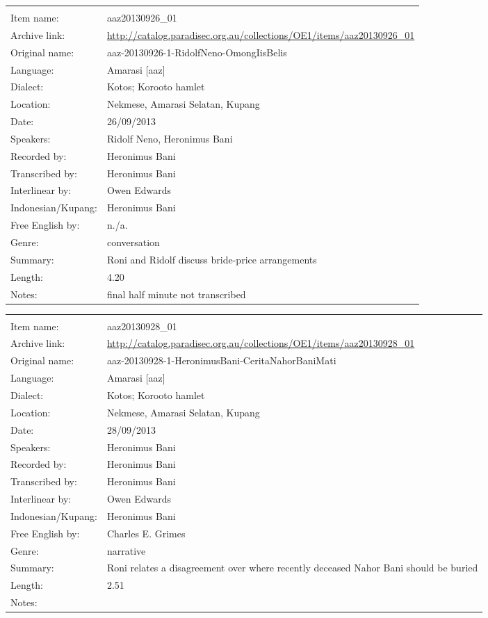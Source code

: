 \newpage
\noindent
\wg\begin{tabular}{lL{.67\textwidth}}
			& \\
Item name:			& aaz20130926{\_}01\\
Archive link:			& \url{http://catalog.paradisec.org.au/collections/OE1/items/aaz20130926_01}\\
Original name:			& aaz-20130926-1-RidolfNeno-OmongIisBelis\\
Language:				& Amarasi [aaz] \\
Dialect:				& Kotos; Koro{\Q}oto hamlet \\
Location:				& Nekmese{\Q}, Amarasi Selatan, Kupang \\
Date:				& 26/09/2013\\
Speakers:				& Ridolf Neno, Heronimus Bani\\
Recorded by:			& Heronimus Bani\\
Transcribed by:		& Heronimus Bani\\
Interlinear by:		& Owen Edwards \\
Indonesian/Kupang:		& Heronimus Bani\\
Free English by:		& n./a.\\
Genre:				& conversation\\
Summary:				& Roni and Ridolf discuss bride-price arrangements\\
Length:				& 4.20\\
Notes:				& final half minute not transcribed\\
\end{tabular}

\newpage
\noindent
\wg\begin{tabular}{lL{.67\textwidth}}
			& \\
Item name:			& aaz20130928{\_}01\\
Archive link:			& \url{http://catalog.paradisec.org.au/collections/OE1/items/aaz20130928_01}\\
Original name:			& {\small aaz-20130928-1-HeronimusBani-CeritaNahorBaniMati}\\
Language:				& Amarasi [aaz] \\
Dialect:				& Kotos; Koro{\Q}oto hamlet \\
Location:				& Nekmese{\Q}, Amarasi Selatan, Kupang \\
Date:				& 28/09/2013\\
Speakers:				& Heronimus Bani\\
Recorded by:			& Heronimus Bani\\
Transcribed by:		& Heronimus Bani\\
Interlinear by:		& Owen Edwards \\
Indonesian/Kupang:		& Heronimus Bani\\
Free English by:		& Charles E. Grimes\\
Genre:				& narrative\\
Summary:				& Roni relates a disagreement over where recently
						deceased Nahor Bani should be buried\\
Length:				& 2.51\\
Notes:				& \\
\end{tabular}

